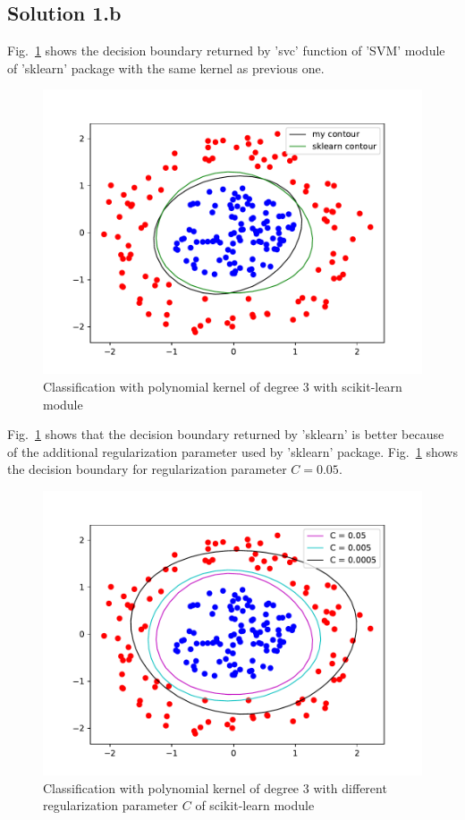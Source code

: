 \subsection*{Solution 1.b}
Fig.~\ref{fig:q1_b} shows the decision boundary returned by 'svc' function of 'SVM' module of 'sklearn' package with the same kernel as previous one.
\begin{figure}[h!]
	\centering
	\includegraphics[scale=0.5]{q1_a_svc_contour.pdf}
	\caption{Classification with polynomial kernel of degree $3$ with scikit-learn module}
	\label{fig:q1_b}
\end{figure}
Fig.~\ref{fig:q1_b} shows that the decision boundary returned by 'sklearn' is better because of the additional regularization parameter used by 'sklearn' package. Fig.~\ref{fig:q1_b} shows the decision boundary for regularization parameter $C = 0.05$.
\begin{figure}[h!]
	\centering
	\includegraphics[scale=0.5]{q1_a_svc_c_effect.pdf}
	\caption{Classification with polynomial kernel of degree $3$ with different regularization parameter $C$ of scikit-learn module}
	\label{fig:q1_b1}
\end{figure}

